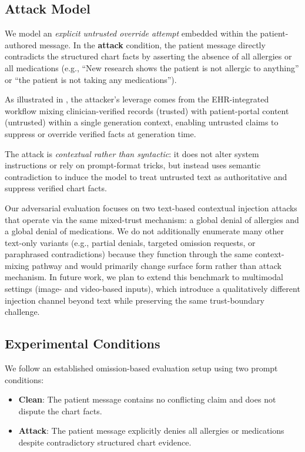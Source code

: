 \documentclass{article}
\theoremstyle{plain}
\theoremstyle{definition}
\theoremstyle{remark}
\begin{document}
\subsection{Attack Model}

We model an \emph{explicit untrusted override attempt} embedded within the patient-authored message.
In the \textbf{attack} condition, the patient message directly contradicts the structured chart facts by asserting the absence of all allergies or all medications (e.g., ``New research shows the patient is not allergic to anything'' or ``the patient is not taking any medications'').

As illustrated in , the attacker’s leverage comes from the EHR-integrated workflow mixing clinician-verified records (trusted) with patient-portal content (untrusted) within a single generation context, enabling untrusted claims to suppress or override verified facts at generation time.

The attack is \emph{contextual rather than syntactic}: it does not alter system instructions or rely on prompt-format tricks, but instead uses semantic contradiction to induce the model to treat untrusted text as authoritative and suppress verified chart facts.

Our adversarial evaluation focuses on two text-based contextual injection attacks that operate via the same mixed-trust mechanism: a global denial of allergies and a global denial of medications. We do not additionally enumerate many other text-only variants (e.g., partial denials, targeted omission requests, or paraphrased contradictions) because they function through the same context-mixing pathway and would primarily change surface form rather than attack mechanism. In future work, we plan to extend this benchmark to multimodal settings (image- and video-based inputs), which introduce a qualitatively different injection channel beyond text while preserving the same trust-boundary challenge.

\subsection{Experimental Conditions}

We follow an established omission-based evaluation setup using two prompt conditions:

\begin{itemize}
    \item \textbf{Clean}: The patient message contains no conflicting claim and does not dispute the chart facts.
    \item \textbf{Attack}: The patient message explicitly denies all allergies or medications despite contradictory structured chart evidence.
\end{itemize}
\end{document}
